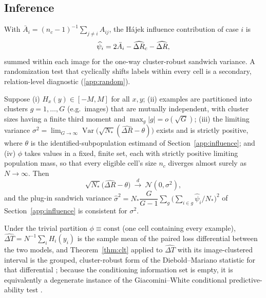 \subsection{Inference}
With $\bar A_i=(n_c-1)^{-1}\sum_{j\ne i}A_{ij}$, the H\'ajek influence contribution of case
$i$ is
\begin{equation}
\widehat\psi_i=2\bar A_i-\widehat{\Delta R}_c-\widehat{\Delta R},
\label{eq:influence}
\end{equation}
summed within each image for the one-way cluster-robust sandwich variance. A randomization
test that cyclically shifts labels within every cell is a secondary, relation-level
diagnostic (\cref{app:random}).

\begin{theorem}\label{thm:clt}
Suppose (i) $H_x(y)\in[-M,M]$ for all $x,y$; (ii) examples are partitioned into clusters
$g=1,\dots,G$ (e.g.\ images) that are mutually independent, with cluster sizes having a
finite third moment and $\max_g|g|=o(\sqrt{G})$; (iii) the limiting variance
$\sigma^2=\lim_{G\to\infty}\operatorname{Var}\!\bigl(\sqrt{N_*}(\widehat{\Delta R}-\theta)\bigr)$
exists and is strictly positive, where $\theta$ is the identified-subpopulation estimand
of Section~\ref{app:influence}; and (iv) $\phi$ takes values in a fixed, finite set,
each with strictly positive limiting population mass, so that every eligible cell's size
$n_c$ diverges almost surely as $N\to\infty$. Then
\begin{equation}
\sqrt{N_*}\bigl(\widehat{\Delta R}-\theta\bigr)\ \xrightarrow{d}\ \mathcal N(0,\sigma^2),
\end{equation}
and the plug-in sandwich variance $\widehat\sigma^2=N_*\dfrac{G}{G-1}\sum_{g}\bigl(\sum_{i\in g}\widehat\psi_i/N_*\bigr)^2$
of Section~\ref{app:influence} is consistent for $\sigma^2$.
\end{theorem}

\begin{corollary}\label{cor:dm}
Under the trivial partition $\phi\equiv\text{const}$ (one cell containing every
example), $\widehat{\Delta T}=N^{-1}\sum_iH_i(y_i)$ is the sample mean of the paired loss
differential between the two models, and
Theorem~\ref{thm:clt} applied to $\widehat{\Delta T}$
with its image-clustered interval is the grouped, cluster-robust form of the
Diebold--Mariano statistic for that differential \citep{diebold1995comparing}; because
the conditioning information set is empty, it is equivalently a degenerate instance of
the Giacomini--White conditional predictive-ability test \citep{giacomini2006tests}.
\end{corollary}
